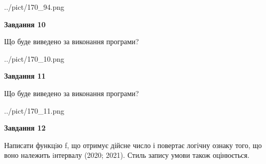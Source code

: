 \documentclass[12pt, ukrainian]{article}
\begin{document}
{\begin {large}
\begin{center}
	{../pict/170_94.png}
\end{center}
\newpage

{\begin {center}\textbf{Завдання 10}\end {center}}

Що буде виведено за виконання програми?\par
\begin{center}
	{../pict/170_10.png}
\end{center}
\newpage

{\begin {center}\textbf{Завдання 11}\end {center}}

Що буде виведено за виконання програми?\par
\begin{center}
	{../pict/170_11.png}
\end{center}
\newpage

{\begin {center}\textbf{Завдання 12}\end {center}}


Написати функцiю f, що отримує дійсне число і повертає логічну ознаку того, що воно належить iнтервалу (2020; 2021). Стиль запису умови також оцінюється.\par
\newpage

\end {large}}
\end{document}
